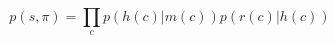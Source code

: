 \begin{equation}
\label{eq:lex_parser}
    p(s,\pi) = \prod_c{p(h(c)|m(c))p(r(c)|h(c))}
\end{equation}